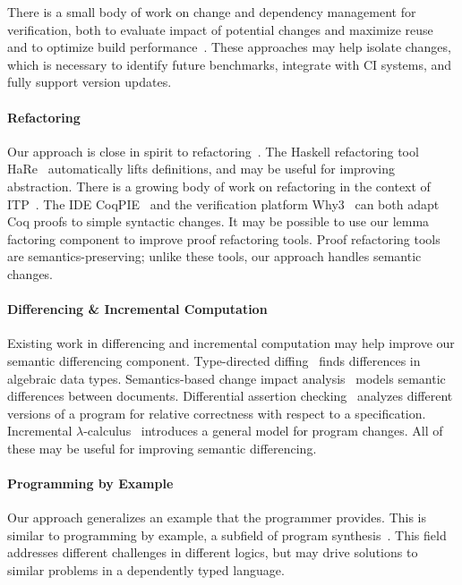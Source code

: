 There is a small body of work on change and dependency management for verification,
both to evaluate impact of potential changes and maximize reuse~\cite{873647, Autexier:2010:CMH:1986659.1986663}
and to optimize build performance~\cite{Celik:2017:IRP:3155562.3155588}.
These approaches may help isolate changes, which is necessary to identify future benchmarks, integrate
with CI systems, and fully support version updates.

\paragraph{Refactoring} Our approach is close in spirit to refactoring~\cite{Mens:2004:SSR:972215.972286}.
The Haskell refactoring tool HaRe~\cite{HaRe} automatically lifts definitions, and may be useful
for improving abstraction.
There is a growing body of work on refactoring in the context of ITP~\cite{Whiteside2011, Bourke_DKK_12}.
The IDE CoqPIE~\cite{Roe2016} and the verification platform Why3~\cite{Bobot2013} can
both adapt Coq proofs to simple syntactic changes.
It may be possible to use our lemma factoring component to improve proof refactoring tools.
Proof refactoring tools are semantics-preserving; unlike these tools,
our approach handles semantic changes.

\paragraph{Differencing \& Incremental Computation} Existing work in differencing and incremental computation may help 
improve our semantic differencing component.
Type-directed diffing~\cite{Miraldo:2017:TDS:3122975.3122976}
finds differences in algebraic data types.
Semantics-based change impact analysis~\cite{Autexier:2010:SCI:1860559.1860580} models semantic differences
between documents.
Differential assertion checking~\cite{differential-assertion-checking-2} analyzes different
versions of a program for relative correctness with respect to a specification.
Incremental $\lambda$-calculus~\cite{Cai:2014:TCH:2594291.2594304} introduces a general model for program changes.
All of these may be useful for improving semantic differencing.

\paragraph{Programming by Example} Our approach generalizes an example that the programmer provides.
This is similar to programming by example, a subfield of 
program synthesis~\cite{DBLP:journals/ftpl/GulwaniPS17}. 
This field addresses different challenges in different logics,
but may drive solutions to similar problems in a dependently typed language.


